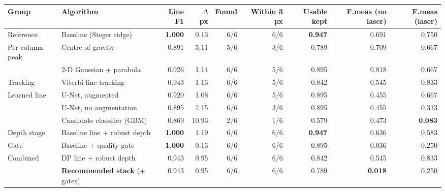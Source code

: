 \begin{tabular}{@{}llrrrrrrr@{}}
\toprule
Group & Algorithm & Line F1 & $\Delta$ px & Found & Within 3 px & Usable kept & F.meas (no laser) & F.meas (laser) \\
\midrule
Reference & Baseline (Steger ridge) & \textbf{1.000} & 0.13 & 6/6 & 6/6 & \textbf{0.947} & 0.691 & 0.750 \\
\addlinespace[2pt]
Per-column peak & Centre of gravity & 0.891 & 5.11 & 5/6 & 3/6 & 0.789 & 0.709 & 0.667 \\
 & 2-D Gaussian + parabola & 0.926 & 1.14 & 6/6 & 5/6 & 0.895 & 0.818 & 0.667 \\
\addlinespace[2pt]
Tracking & Viterbi line tracking & 0.943 & 1.13 & 6/6 & 5/6 & 0.842 & 0.545 & 0.833 \\
\addlinespace[2pt]
Learned line & U-Net, augmented & 0.920 & 1.08 & 6/6 & 5/6 & 0.895 & 0.455 & 0.667 \\
 & U-Net, no augmentation & 0.895 & 7.15 & 6/6 & 3/6 & 0.895 & 0.455 & 0.333 \\
 & Candidate classifier (GBM) & 0.869 & 10.93 & 2/6 & 1/6 & 0.579 & 0.473 & \textbf{0.083} \\
\addlinespace[2pt]
Depth stage & Baseline line + robust depth & \textbf{1.000} & 1.19 & 6/6 & 6/6 & \textbf{0.947} & 0.636 & 0.583 \\
\addlinespace[2pt]
Gate & Baseline + quality gate & \textbf{1.000} & 0.13 & 6/6 & 6/6 & 0.895 & 0.036 & 0.250 \\
\addlinespace[2pt]
Combined & DP line + robust depth & 0.943 & 0.95 & 6/6 & 6/6 & 0.842 & 0.545 & 0.833 \\
 & \textbf{Recommended stack} (+ gates) & 0.943 & 0.95 & 6/6 & 6/6 & 0.789 & \textbf{0.018} & 0.250 \\
\bottomrule
\end{tabular}
